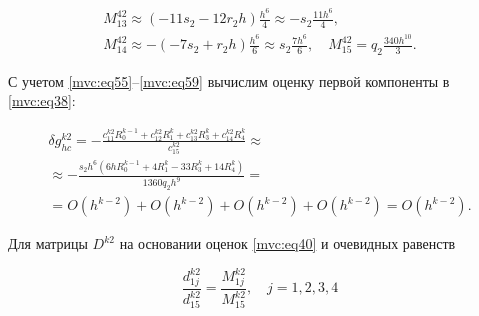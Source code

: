 \begin{gather}
\\

\label{mvc:eq59}  

M_{13}^{42}\approx

 (-11s_2 - 12r_2h )\frac{h^6}{4}\approx-s_2\frac{11h^6}{4},



\\

\label{mvc:eq59}

M_{14}^{42}\approx

  -(-7s_2 + r_2h )\frac{h^6}{6}\approx s_2\frac{7h^6}{6},\quad 

  M_{15}^{42}=q_2\frac{340h^{10}}{3}.

\end{gather}



С учетом \eqref{mvc:eq55}--\eqref{mvc:eq59} вычислим оценку первой компоненты в \eqref{mvc:eq38}:

\begin{multline}

\label{mvc:eq60}

   \delta g_{hc}^{k2}=

 -\frac{c_{11}^{k2} R_{0}^{k-1}+c_{12}^{k2} R_{1}^k+c_{13}^{k2} R_{3}^k+c_{14}^{k2} R_{4}^k}{c_{15}^{k2}}\approx

\\

\approx-\frac{s_2h^6(6h R_{0}^{k-1}+4 R_{1}^{k}-33 R_{3}^{k}+14 R_{4}^{k})}{1360q_2h^{9}}=

\\

=O(h^{k-2})+O(h^{k-2})+O(h^{k-2})+O(h^{k-2})=O(h^{k-2}).

\end{multline}



Для матрицы $D^{k2}$ на основании оценок \eqref{mvc:eq40} и очевидных равенств

\begin{equation}

\label{mvc:eq61}

   \frac{d_{1j}^{k2}}{d_{15}^{k2}}=\frac{M_{1j}^{k2}}{M_{15}^{k2}},\quad 

j=1,  2,  3,  4

\end{equation}

